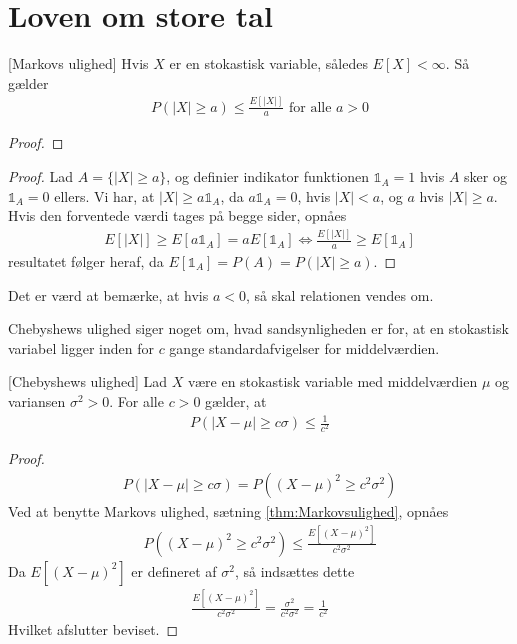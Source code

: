 \section{Loven om store tal}
\begin{thm} \label{thm:Markovsulighed}[Markovs ulighed]
Hvis $X$ er en stokastisk variable, således
$E[X] < \infty$. Så gælder
\begin{align*}
    P(|X|\geq a) \leq \frac{E[|X|]}{a} \text{ for alle } a > 0
\end{align*}
\end{thm}
\begin{proof}
\end{proof}
\begin{proof}
  Lad $A=\{|X|\geq a\}$, og definier indikator funktionen $\mathbb{1}_A = 1$ hvis $A$ sker og $\mathbb{1}_{A} = 0$ ellers. Vi har, at $|X| \geq a\mathbb{1}_{A}$, da $a\mathbb{1}_{A} = 0$, hvis $|X| < a$, og $a$ hvis $|X| \geq a$. Hvis den forventede værdi tages på begge sider, opnåes
  \begin{align*}
    E[|X|]\geq E[a\mathbb{1}_{A}] = a E[\mathbb{1}_A] \iff \frac{E[|X|]}{a}\geq E[\mathbb{1}_A]
  \end{align*}
  resultatet følger heraf, da $E[\mathbb{1}_{A}] = P(A) = P(|X| \geq a)$.
\end{proof}
Det er værd at bemærke, at hvis $a<0$, så skal relationen vendes om.

Chebyshews ulighed siger noget om, hvad sandsynligheden er for, at en stokastisk variabel ligger inden for $c$ gange standardafvigelser for middelværdien.
\begin{thm} \label{Thm:Chebyshewsulighed}[Chebyshews ulighed]
    Lad $X$ være en stokastisk variable med middelværdien $\mu$ og variansen $\sigma^2>0$. For alle $c>0$ gælder, at
    \begin{align*}
        P(|X-\mu|\geq c \sigma)\leq \frac{1}{c^2}
    \end{align*}
\end{thm}
\begin{proof}%
    \begin{align*}
        P(|X-\mu|\geq c \sigma)=P((X-\mu)^2\geq c^2\sigma^2)
    \end{align*}
Ved at benytte Markovs ulighed, sætning \ref{thm:Markovsulighed}, opnåes
\begin{align*}
    P((X-\mu)^2\geq c^2\sigma^2) \leq \frac{E[(X-\mu)^2]}{c^2\sigma^2}
\end{align*}
Da $E[(X-\mu)^2]$ er defineret af $\sigma^2$, så indsættes dette
\begin{align*}
    \frac{E[(X-\mu)^2]}{c^2\sigma^2} = \frac{\sigma^2}{c^2\sigma^2} = \frac{1}{c^2}
\end{align*}
Hvilket afslutter beviset.
\end{proof}

